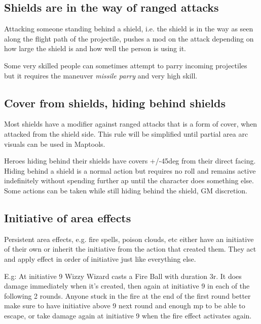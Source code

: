 \subsection*{Shields are in the way of ranged attacks}
Attacking someone standing behind a shield, i.e. the shield is in the way as seen along the flight path of the projectile, pushes a mod on the attack depending on how large the shield is and how well the person is using it.

Some very skilled people can sometimes attempt to parry incoming projectiles but it requires the maneuver \emph{missile parry} and very high skill.


\subsection*{Cover from shields, hiding behind shields}
Most shields have a modifier against ranged attacks that is a form of cover, when attacked from the shield side. This rule will be simplified until partial area arc visuals can be used in Maptools.


Heroes hiding behind their shields have covers +/-45deg from their direct facing. Hiding behind a shield is a normal action but requires no roll and remains active indefinitely without spending further ap until the character does something else. Some actions can be taken while still hiding behind the shield, GM discretion.


\subsection*{Initiative of area effects}
Persistent area effects, e.g. fire spells, poison clouds, etc either have an initiative of their own or inherit the initiative from the action that created them. They act and apply effect in order of initiative just like everything else.

E.g: At initiative 9 Wizzy Wizard casts a Fire Ball with duration 3r. It does damage immediately when it's created, then again at initiative 9 in each of the following 2 rounds. Anyone stuck in the fire at the end of the first round better make sure to have initiative above 9 next round and enough mp to be able to escape, or take damage again at initiative 9 when the fire effect activates again.

